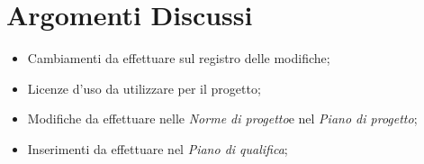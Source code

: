 \section{Argomenti Discussi}
	\begin{itemize}
		\item Cambiamenti da effettuare sul registro delle modifiche;%
		\item Licenze d'uso da utilizzare per il progetto;
		\item Modifiche da effettuare nelle \textit{Norme di progetto}\doc e nel \textit{Piano di progetto}\docs; 
		\item Inserimenti da effettuare nel \textit{Piano di qualifica}\doc;%
	\end{itemize}